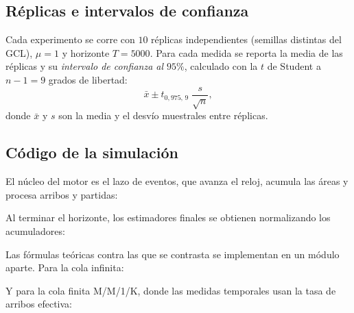 \documentclass[11pt]{article}
\begin{document}
\subsection{R\'eplicas e intervalos de confianza}

Cada experimento se corre con $10$ r\'eplicas independientes (semillas
distintas del GCL), $\mu = 1$ y horizonte $T = 5000$. Para cada medida se
reporta la media de las r\'eplicas y su \emph{intervalo de confianza al
$95\%$}, calculado con la $t$ de Student a $n-1 = 9$ grados de libertad:
\begin{equation}
\bar{x} \pm t_{0{,}975,\,9}\;\frac{s}{\sqrt{n}},
\end{equation}
donde $\bar{x}$ y $s$ son la media y el desv\'io muestrales entre r\'eplicas.

\subsection{C\'odigo de la simulaci\'on}

El n\'ucleo del motor es el lazo de eventos, que avanza el reloj, acumula
las \'areas y procesa arribos y partidas:



Al terminar el horizonte, los estimadores finales se obtienen normalizando
los acumuladores:



Las f\'ormulas te\'oricas contra las que se contrasta se implementan en un
m\'odulo aparte. Para la cola infinita:



Y para la cola finita M/M/1/K, donde las medidas temporales usan la tasa de
arribos efectiva:


\end{document}
